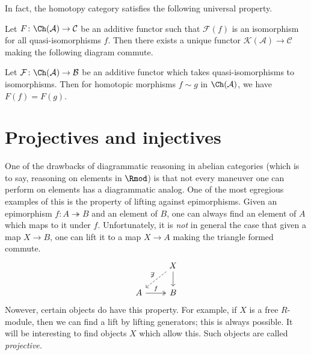 \documentclass[main.tex]{subfiles}
\begin{document}
In fact, the homotopy category satisfies the following universal property.

\begin{proposition}
  Let $F\colon \Ch(\mathcal{A}) \to \mathcal{C}$ be an additive functor such that $\mathcal{F}(f)$ is an isomorphism for all quasi-isomorphisms $f$. Then there exists a unique functor $\mathcal{K}(\mathcal{A}) \to \mathcal{C}$ making the following diagram commute.
\end{proposition}

\begin{proposition}
  \label{prop:additive_functors_from_derived_category_squash_homotopies}
  Let $\mathcal{F}\colon \Ch(\mathcal{A}) \to \mathcal{B}$ be an additive functor which takes quasi-isomorphisms to isomorphisms. Then for homotopic morphisms $f \sim g$ in $\Ch(\mathcal{A})$, we have $F(f) = F(g)$.
\end{proposition}

\section{Projectives and injectives}
\label{ssc:projectives_and_injectives}

One of the drawbacks of diagrammatic reasoning in abelian categories (which is to say, reasoning on elements in $\Rmod$) is that not every maneuver one can perform on elements has a diagrammatic analog. One of the most egregious examples of this is the property of lifting against epimorphisms. Given an epimorphism $f\colon A \twoheadrightarrow B$ and an element of $B$, one can always find an element of $A$ which maps to it under $f$. Unfortunately, it is \emph{not} in general the case that given a map $X \to B$, one can lift it to a map $X \to A$ making the triangle formed commute.
\begin{equation*}
  \begin{tikzcd}
    & X
    \arrow[d]
    \arrow[dl, swap, dashed, "\not\exists"]
    \\
    A
    \arrow[r, two heads, "f"]
    & B
  \end{tikzcd}
\end{equation*}
Nowever, certain objects do have this property. For example, if $X$ is a free $R$-module, then we can find a lift by lifting generators; this is always possible. It will be interesting to find objects $X$ which allow this. Such objects are called \emph{projective.}
\end{document}
